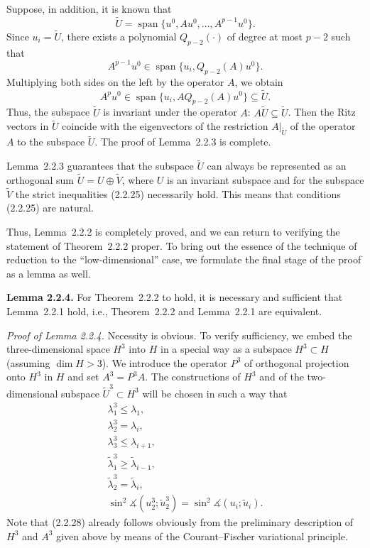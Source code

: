 \documentclass[11pt,oneside]{book}
\newcommand{\myspan}{\operatorname{span}}
\newcommand{\ang}{\measuredangle}
\begin{document}
Suppose, in addition, it is known that
\[
\widetilde{U} = \myspan\{u^0, Au^0, \ldots, A^{p-1} u^0\}.
\]
Since $u_i = \widetilde{U}$, %
there exists a polynomial $Q_{p-2}(\cdot)$ of degree at most $p - 2$ such that
\[
A^{p-1} u^0 \in \myspan\{u_i, Q_{p-2}(A) u^0\}.
\]
Multiplying both sides on the left by the operator $A$, we obtain
\[
A^p u^0 \in \myspan\{u_i, A Q_{p-2}(A) u^0\} \subseteq \widetilde{U}.
\]
Thus, the subspace $\widetilde{U}$ is invariant under the operator $A$: $A\widetilde{U} \subseteq \widetilde{U}$. Then the Ritz vectors in $\widetilde{U}$ coincide with the eigenvectors of the restriction $A|_{\widetilde{U}}$ of the operator $A$ to the subspace $\widetilde{U}$. The proof of Lemma~2.2.3 is complete.

Lemma~2.2.3 guarantees that the subspace $\widetilde{U}$ can always be represented as an orthogonal sum $\widetilde{U} = U \oplus \widetilde{V}$, where $U$ is an invariant subspace and for the subspace $\widetilde{V}$ the strict inequalities (2.2.25) necessarily hold. This means that conditions (2.2.25) are natural.

Thus, Lemma~2.2.2 is completely proved, and we can return to verifying the statement of Theorem~2.2.2 proper. To bring out the essence of the technique of reduction to the ``low-dimensional'' case, we formulate the final stage of the proof as a lemma as well.

\textbf{Lemma 2.2.4.} For Theorem~2.2.2 to hold, it is necessary and sufficient that Lemma~2.2.1 hold, i.e., Theorem~2.2.2 and Lemma~2.2.1 are equivalent.

\textit{Proof of Lemma 2.2.4.} Necessity is obvious. To verify sufficiency, we embed the three-dimensional space $H^3$ into $H$ in a special way as a subspace $H^3 \subset H$ (assuming $\dim H > 3$). We introduce the operator $P^3$ of orthogonal projection onto $H^3$ in $H$ and set $A^3 = P^3 A$. The constructions of $H^3$ and of the two-dimensional subspace $\widetilde{U}^3 \subset H^3$ will be chosen in such a way that
\begin{gather*}
\lambda_1^3 \leqslant \lambda_1, \tag{2.2.28} \\
\lambda_2^3 = \lambda_i, \tag{2.2.29} \\
\lambda_3^3 \leqslant \lambda_{i+1}, \tag{2.2.30} \\
\tilde{\lambda}_1^3 \geqslant \tilde{\lambda}_{i-1}, \tag{2.2.31} \\
\tilde{\lambda}_2^3 = \tilde{\lambda}_i, \tag{2.2.32} \\
\sin^2 \ang(u_2^3; \tilde{u}_2^3) = \sin^2 \ang(u_i; \tilde{u}_i). \tag{2.2.33}
\end{gather*}
Note that (2.2.28) already follows obviously from the preliminary description of $H^3$ and $A^3$ given above by means of the Courant--Fischer variational principle.
\end{document}
